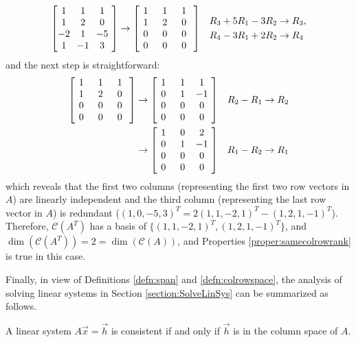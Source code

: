 \begin{solution}
\begin{align*}
\left[\begin{array}{@{\,}wc{10pt}wc{10pt}wc{10pt}wc{10pt}@{\,}}
1 & 1 & 1 \\
1 & 2 & 0 \\
-2 & 1 & -5 \\
1 & -1 & 3
\end{array}\right] 
&\rightarrow
\left[\begin{array}{@{\,}wc{10pt}wc{10pt}wc{10pt}wc{10pt}@{\,}}
1 & 1 & 1 \\
1 & 2 & 0 \\
0 & 0 & 0 \\
0 & 0 & 0
\end{array}\right] 
& \begin{aligned}
R_3 + 5R_1 - 3R_2 &\to R_3, \\
R_4 - 3R_1 + 2R_2 &\to R_4
\end{aligned}
\end{align*}
and the next step is straightforward:
\begin{align*}
\left[\begin{array}{@{\,}wc{10pt}wc{10pt}wc{10pt}wc{10pt}@{\,}}
1 & 1 & 1 \\
1 & 2 & 0 \\
0 & 0 & 0 \\
0 & 0 & 0
\end{array}\right] 
&\rightarrow
\left[\begin{array}{@{\,}wc{10pt}wc{10pt}wc{10pt}wc{10pt}@{\,}}
1 & 1 & 1 \\
0 & 1 & -1 \\
0 & 0 & 0 \\
0 & 0 & 0
\end{array}\right] 
& R_2 - R_1 \to R_2 \\
&\rightarrow
\left[\begin{array}{@{\,}wc{10pt}wc{10pt}wc{10pt}wc{10pt}@{\,}}
1 & 0 & 2 \\
0 & 1 & -1 \\
0 & 0 & 0 \\
0 & 0 & 0
\end{array}\right] 
& R_1 - R_2 \to R_1
\end{align*}
which reveals that the first two columns (representing the first two row vectors in $A$) are linearly independent and the third column (representing the last row vector in $A$) is redundant ($(1,0,-5,3)^T = 2(1,1,-2,1)^T-(1,2,1,-1)^T$). Therefore, $\mathcal{C}(A^T)$ has a basis of $\{(1,1,-2,1)^T, (1,2,1,-1)^T\}$, and $\dim(\mathcal{C}(A^T)) = 2 = \dim(\mathcal{C}(A))$, and Properties \ref{proper:samecolrowrank} is true in this case.
\end{solution}
Finally, in view of Definitions \ref{defn:span} and \ref{defn:colrowspace}, the analysis of solving linear systems in Section \ref{section:SolveLinSys} can be summarized as follows.
\begin{proper}
\label{proper:consistentcolspace}
A linear system $A\vec{x} = \vec{h}$ is consistent if and only if $\vec{h}$ is in the column space of $A$.
\end{proper}

